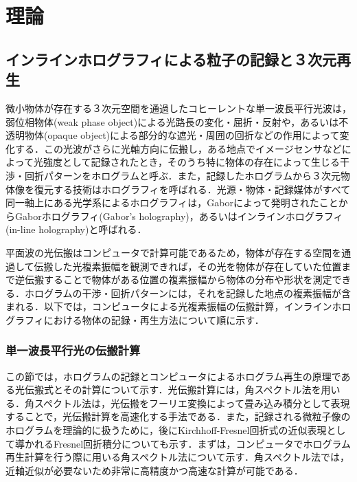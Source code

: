 \section{理論}
\subsection{インラインホログラフィによる粒子の記録と３次元再生}
微小物体が存在する３次元空間を通過したコヒーレントな単一波長平行光波は，弱位相物体(weak phase object)による光路長の変化・屈折・反射や，あるいは不透明物体(opaque object)による部分的な遮光・周囲の回折などの作用によって変化する．この光波がさらに光軸方向に伝搬し，ある地点でイメージセンサなどによって光強度として記録されたとき，そのうち特に物体の存在によって生じる干渉・回折パターンをホログラムと呼ぶ．また，記録したホログラムから３次元物体像を復元する技術はホログラフィ\cite{gabor}を呼ばれる．光源・物体・記録媒体がすべて同一軸上にある光学系によるホログラフィは，Gaborによって発明されたことからGaborホログラフィ(Gabor's holography)，あるいはインラインホログラフィ(in-line holography)と呼ばれる．

平面波の光伝搬はコンピュータで計算可能である\cite{kreis}ため，物体が存在する空間を通過して伝搬した光複素振幅を観測できれば，その光を物体が存在していた位置まで逆伝搬することで物体がある位置の複素振幅から物体の分布や形状を測定できる．ホログラムの干渉・回折パターンには，それを記録した地点の複素振幅が含まれる．以下では，コンピュータによる光複素振幅の伝搬計算，インラインホログラフィにおける物体の記録・再生方法について順に示す．

\subsubsection{単一波長平行光の伝搬計算}\label{sec:lightwaveProp}
この節では，ホログラムの記録とコンピュータによるホログラム再生の原理である光伝搬式とその計算について示す．光伝搬計算には，角スペクトル法\cite{goodman}を用いる．角スペクトル法は，光伝搬をフーリエ変換によって畳み込み積分として表現することで，光伝搬計算を高速化する手法である．また，記録される微粒子像のホログラムを理論的に扱うために，後にKirchhoff-Fresnel回折式の近似表現として導かれるFresnel回折積分\cite{kreis}についても示す．まずは，コンピュータでホログラム再生計算を行う際に用いる角スペクトル法について示す．角スペクトル法では，近軸近似が必要ないため非常に高精度かつ高速な計算が可能である．

